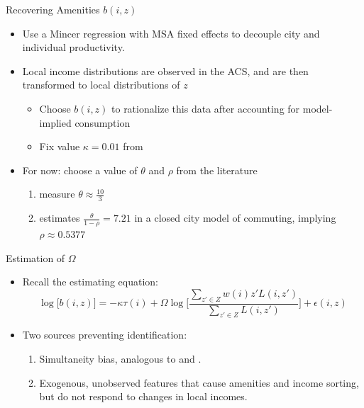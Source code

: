 \documentclass{beamer}
\theoremstyle{plain}
\begin{document}
\begin{frame}{Recovering Amenities $b(i, z)$}
	\begin{itemize}
		\color{black}
		\itemsep1em
		\item Use a Mincer regression with MSA fixed effects to decouple city and individual productivity. \pause
		\item Local income distributions are observed in the ACS, and are then transformed to local distributions of $z$ 
		\begin{itemize}
			\item Choose $b(i, z)$ to rationalize this data after accounting for model-implied consumption
			\item Fix value $\kappa = 0.01$ from \cite{berlinwall} \pause
		\end{itemize}
		\item For now: choose a value of $\theta$ and $\rho$ from the literature
		\begin{enumerate}
			\item \cite{morettihornbeck} measure $\theta \approx \frac{10}{3}$
			\item \cite{herzog2022} estimates $\frac{\theta}{1-\rho} = 7.21$ in a closed city model of commuting, implying $\rho \approx 0.5377$ 
		\end{enumerate}
	\end{itemize}

\end{frame}

\begin{frame}{Estimation of $\Omega$}
	\begin{itemize}
		\color{black}
		\itemsep1em
		\item Recall the estimating equation: 
		\begin{equation*}
			\log\big[b(i, z)\big] = -\kappa\tau(i) + \Omega\log\bigg[\frac{\sum_{z' \in Z}w(i)z'L(i, z')}{\sum_{z' \in Z}L(i, z')}\bigg] + \epsilon(i, z)
		\end{equation*} \pause
		\item Two sources preventing identification:
		\begin{enumerate}
			\item Simultaneity bias, analogous to \cite{Coutureetal} and \cite{diamond2016}.
			\item Exogenous, unobserved features that cause amenities and income sorting, \color{red} but do not respond to changes in local incomes\color{black}. 
		\end{enumerate}
	\end{itemize}
\end{frame}
\end{document}
